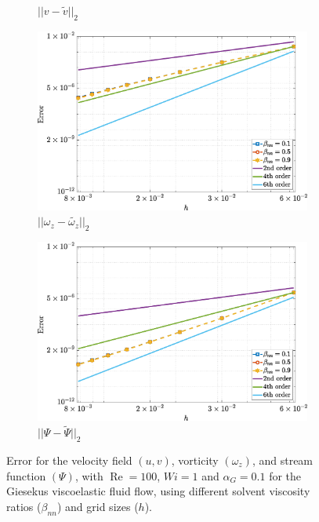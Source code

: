 \documentclass[preprint, 12pt]{elsarticle}
\begin{document}
\begin{figure}[H]
\begin{subfigure}[b]{.46\textwidth}
        \caption{$||v - \widetilde{v}||_{2}$}
        \label{error_v_2nd_Case1_giesekus_alphaG_0.1}
    \end{subfigure}
    \qquad
    \begin{subfigure}[b]{.46\textwidth}
        \includegraphics[width=\textwidth]{NormErr_2nd_Re_100_Wi_1_epsilon_0_xi_0_alphaG_0.1_Dt_1e-06_at_0.05_tipsim_1_MMS_12_Wz.eps}
        \caption{$||\omega_{z} - \widetilde{\omega_{z}}||_{2}$}
        \label{error_wz_2nd_Case1_giesekus_alphaG_0.1}
    \end{subfigure}
    \qquad
    \begin{subfigure}[b]{.46\textwidth}
        \includegraphics[width=\textwidth]{NormErr_2nd_Re_100_Wi_1_epsilon_0_xi_0_alphaG_0.1_Dt_1e-06_at_0.05_tipsim_1_MMS_12_Psi.eps}
        \caption{$||\Psi - \widetilde{\Psi}||_{2}$}
        \label{error_psi_2nd_Case1_oldorydbgiesekus_alphaG_0.1}
    \end{subfigure}
    \vspace{0.02cm}
    \caption{Error for the velocity field $({u},{v})$, vorticity $({\omega_{z}})$, and stream function $({\Psi})$, with $\operatorname{Re}=100$, $Wi=1$ and $\alpha_G=0.1$ for the Giesekus viscoelastic fluid flow, using different solvent viscosity ratios ($\beta_{nn}$) and grid sizes ($h$).\label{fig_Giesekus_error011}}
\end{figure}
\end{document}
